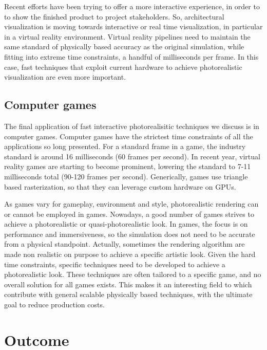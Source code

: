 Recent efforts have been trying to offer a more interactive experience, in order to to show the finished product to project stakeholders. So, architectural visualization is moving towards interactive or real time visualization, in particular in a virtual reality environment. Virtual reality pipelines need to maintain the same standard of physically based accuracy as the original simulation, while fitting into extreme time constraints, a handful of milliseconds per frame. In this case, fast techniques that exploit current hardware to achieve photorealistic visualization are even more important.


\subsection{Computer games}

The final application of fast interactive photorealisitic techniques we discuss is in computer games. Computer games have the strictest time constraints of all the applications so long presented. For a standard frame in a game, the industry standard is around 16 milliseconds (60 frames per second). In recent year, virtual reality games are starting to become prominent, lowering the standard to 7-11 milliseconds total (90-120 frames per second). Generically, games use triangle based rasterization, so that they can leverage custom hardware on GPUs. 

As games vary for gameplay, environment and style, photorealistic rendering can or cannot be employed in games. Nowadays, a good number of games strives to achieve a photorealistic or quasi-photorealistic look. In games, the focus is on performance and immersiveness, so the simulation does not need to be accurate from a physical standpoint. Actually, sometimes the rendering algorithm are made non realistic on purpose to achieve a specific artistic look. Given the hard time constraints, specific techniques need to be developed to achieve a photorealistic look. These techniques are often tailored to a specific game, and no overall solution for all games exists. This makes it an interesting field to which contribute with general scalable physically based techniques, with the ultimate goal to reduce production costs.

\section{Outcome}

